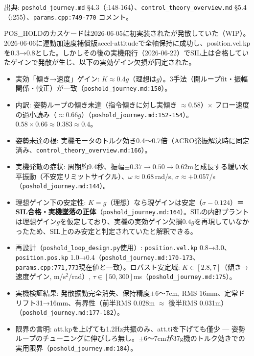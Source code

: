 \documentclass[a4paper,10pt]{ltjsarticle}
\begin{document}
出典: \texttt{poshold\_journey.md} §4.3（:148-164）、\texttt{control\_theory\_overview.md} §5.4（:255）、\texttt{params.cpp:749-770} コメント。

POS\_HOLDのカスケードは2026-06-05に初実装されたが発散していた（WIP）。2026-06-06に運動加速度補償版accel-attitudeで全軸保持に成功し、position.vel.kpを0.3→0.8とした。しかしその後の実機飛行（2026-06-22）でSIL上は合格していたゲインで発散が生じ、以下の実効ゲイン欠損が同定された。

\begin{itemize}[leftmargin=*]
  \item 実効「傾き→速度」ゲイン: $K \approx 0.4g$（理想は$g$）。3手法（開ループfit・振幅関係・較正）が一致（\texttt{poshold\_journey.md:150}）。
  \item 内訳: 姿勢ループの傾き未達（指令傾きに対し実傾き $\approx 0.58$）× フロー速度の過小読み（$\approx 0.66g$）（\texttt{poshold\_journey.md:152-154}）。$0.58 \times 0.66 \approx 0.383 \approx 0.4$。
  \item 姿勢未達の根: 実機モータのトルク効き0.4〜0.7倍（ACRO発振解決時に同定済み、\texttt{control\_theory\_overview.md:166}）。
  \item 実機発散の症状: 周期約9.4秒、振幅$\pm0.37\rightarrow0.50\rightarrow0.62$mと成長する緩い水平振動（不安定リミットサイクル）、$\omega\approx0.68$\,rad/s, $\sigma\approx+0.057$/s（\texttt{poshold\_journey.md:144}）。
  \item 理想ゲイン下の安定性: $K=g$（理想）なら現ゲインは安定（$\sigma -0.124$）\textbf{＝SIL合格・実機墜落の正体}（\texttt{poshold\_journey.md:164}）。SILの内部プラントは理想ゲイン$g$を仮定しており、実機の実効ゲイン欠損$0.4g$を再現していなかったため、SIL上のみ安定と判定されていたと解釈できる。
  \item 再設計（\texttt{poshold\_loop\_design.py}使用）: \texttt{position.vel.kp} 0.8→3.0、\texttt{position.pos.kp} 1.0→0.4（\texttt{poshold\_journey.md:170-173}、\texttt{params.cpp:771,773}現在値と一致）。ロバスト安定域: $K\in[2.8,7]$（傾き→速度ゲイン, m/s$^2$/rad）, $\tau\in[50,300]$ms（\texttt{poshold\_journey.md:175}）。
  \item 実機検証結果: 発散振動完全消失、保持精度$\pm6$〜7cm, RMS 16mm、定常ドリフト31→16mm、有界性（前半RMS 0.028m $\approx$ 後半RMS 0.031m）（\texttt{poshold\_journey.md:177-182}）。
  \item 限界の言明: att.kpを上げても1.2Hz共振のみ、att.tiを下げても僅少 --- 姿勢ループのチューニングに伸びしろ無し。$\pm6$〜7cmが37g機のトルク効きでの実用限界（\texttt{poshold\_journey.md:184}）。
\end{itemize}
\end{document}
